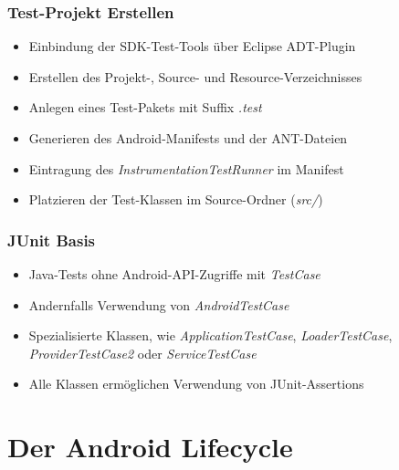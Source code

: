 \begin{frame}
	\frametitle{Test-Projekt Erstellen}
	\begin{itemize}
		\item Einbindung der SDK-Test-Tools über Eclipse ADT-Plugin
		\item Erstellen des Projekt-, Source- und Resource-Verzeichnisses
		\item Anlegen eines Test-Pakets mit Suffix \emph{.test}
		\item Generieren des Android-Manifests und der ANT-Dateien
		\item Eintragung des \emph{InstrumentationTestRunner} im Manifest
		\item Platzieren der Test-Klassen im Source-Ordner (\emph{src/})
	\end{itemize}
\end{frame}

\begin{frame}
	\frametitle{JUnit Basis}
	\begin{itemize}
		\item Java-Tests ohne Android-API-Zugriffe mit \emph{TestCase}
		\item Andernfalls Verwendung von \emph{AndroidTestCase}
		\item Spezialisierte Klassen, wie \emph{ApplicationTestCase}, 
			\emph{LoaderTestCase}, \emph{ProviderTestCase2} oder \emph{ServiceTestCase}
		\item Alle Klassen ermöglichen Verwendung von JUnit-Assertions
	\end{itemize}
\end{frame}

\section{Der Android Lifecycle}
